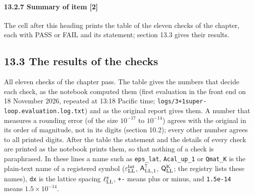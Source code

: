 \documentclass[
  10pt,
]{article}
\begin{document}
\hypertarget{summary-of-item-2}{%
\paragraph{13.2.7 Summary of item {[}2{]}}\label{summary-of-item-2}}

The cell after this heading prints the table of the eleven checks of the
chapter, each with PASS or FAIL and its statement; section 13.3 gives
their results.

\hypertarget{the-results-of-the-checks}{%
\subsection{13.3 The results of the
checks}\label{the-results-of-the-checks}}

All eleven checks of the chapter pass. The table gives the numbers that
decide each check, as the notebook computed them (first evaluation in
the front end on 18 November 2026, repeated at 13:18 Pacific time;
\texttt{logs/3+1super-loop.evaluation.log.txt}) and as the original
report gives them. A number that measures a rounding error (of the size
\(10^{-17}\) to \(10^{-14}\)) agrees with the original in its order of
magnitude, not in its digits (section 10.2); every other number agrees
to all printed digits. After the table the statement and the details of
every check are printed as the notebook prints them, so that nothing of
a check is paraphrased. In these lines a name such as \texttt{eps\_lat},
\texttt{Acal\_up\_1} or \texttt{Qmat\_K} is the plain-text name of a
registered symbol (\(\varepsilon^{\rm lat}_{\rm LL}\),
\(\mathsf A^\uparrow_{{\rm LL},1}\), \(\mathsf Q^{\rm K}_{\rm LL}\); the
registry lists these names), \texttt{dx} is the lattice spacing
\(\ell^{\rm x}_{\rm LL}\), \texttt{+-} means plus or minus, and
\texttt{1.5e-14} means \(1.5\times10^{-14}\).
\end{document}
